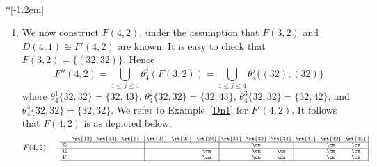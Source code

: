 \begin{exam}\label{ex:free-patterns}\ \\*[-1.2em]
\begin{enumerate}[label = (\alph*)]
\item \label{exam6.12_i} 
We now construct $F(4,2)$, under the assumption that $F(3,2)$ and
 $D(4,1) \cong F'(4,2)$ are known. It is easy to check that $F(3,2)
 = \{(32,32)\}$. Hence
\[
F''(4,2)=\bigcup_{1\leq j \leq 4}\theta^j_4(F(3,2)) =\bigcup_{1\leq j
 \leq 4}\theta^j_4\{(32),(32)\}
\]
where $\theta^1_4\{32,32\}= \{32,43\}$, $\theta^2_4\{32,32\}=
\{32,43\}$, $\theta^3_4\{32,32\}= \{32,42\}$, and
$\theta^4_4\{32,32\}= \{32,32\}$. We refer to Example~\ref{Dn1} for
$F'(4,2)$. It follows that $F(4,2)$ is as depicted below:
 \[ F(4,2): \quad
\text{\setlength{\arraycolsep}{2.7pt}\scriptsize
$\displaystyle 
\begin{array}{c|ccc|ccc|ccc|ccc|}
 &\rt{12}&\rt{13}&\rt{14}&\rt{21} &\rt{23}&\rt{24}&\rt{31}&\rt{32}
 &\rt{34}&\rt{41}&\rt{42}&\rt{43} \\ \hline
 32 &&&	&&&	&&\cm&	&&\cm&\cm\\ \hline
 42 &&&	&&&\cm	&&\cm&\cm	&&\cm&\cm\\ 
 43 &&&	&&&\cm	&&\cm&\cm	&&\cm&\cm\\ 
 \hline
\end{array}\; .$}
\]


\end{enumerate}
\end{exam}
